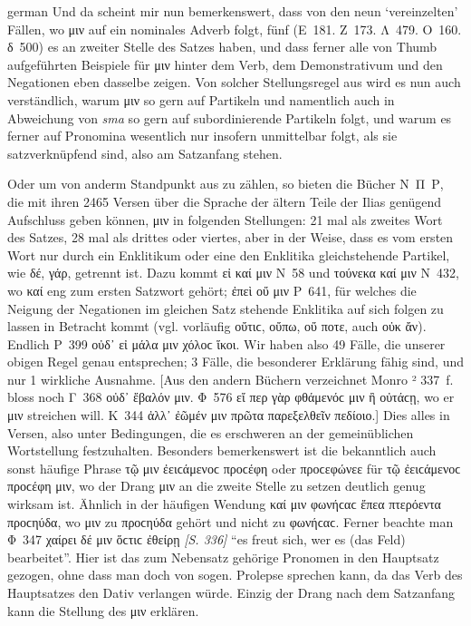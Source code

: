 \begin{otherlanguage*}{german}
Und da scheint mir nun bemerkenswert, dass von den neun ‘vereinzelten’ Fällen, wo μιν auf ein nominales Adverb folgt, fünf (Ε~181. Ζ~173. Λ~479. Ο~160. δ~500) es an zweiter Stelle des Satzes haben, und dass ferner alle von Thumb aufgeführten Beispiele für μιν hinter dem Verb, dem Demonstrativum und den Negationen eben dasselbe zeigen. Von solcher Stellungsregel aus wird es nun auch verständlich, warum μιν so gern auf Partikeln und namentlich auch in Abweichung von \emph{sma} so gern auf subordinierende Partikeln folgt, und warum es ferner auf Pronomina wesentlich nur insofern unmittelbar folgt, als sie satzverknüpfend sind, also am Satzanfang stehen.

Oder um von anderm Standpunkt aus zu zählen, so bieten die Bücher Ν~Π~Ρ, die mit ihren 2465 Versen über die Sprache der ältern Teile der Ilias genügend Aufschluss geben können, μιν in folgenden Stellungen: 21 mal als zweites Wort des Satzes, 28 mal als drittes oder viertes, aber in der Weise, dass es vom ersten Wort nur durch ein Enklitikum oder eine den Enklitika gleichstehende Partikel, wie δέ, γάρ, getrennt ist. Dazu kommt εἰ καί μιν Ν~58 und τούνεκα καί μιν Ν~432, wo καί eng zum ersten Satzwort gehört; ἐπεὶ οὔ μιν Ρ~641, für welches die Neigung der Negationen im gleichen Satz stehende Enklitika auf sich folgen zu lassen in Betracht kommt (vgl. vorläufig οὔτιϲ, οὔπω, οὔ ποτε, auch οὐκ ἄν). Endlich Ρ~399 οὐδ᾽ εἰ μάλα μιν χόλοϲ ἵκοι. Wir haben also 49 Fälle, die unserer obigen Regel genau entsprechen; 3 Fälle, die besonderer Erklärung fähig sind, und nur 1 wirkliche Ausnahme. [Aus den andern Büchern verzeichnet Monro ² 337~f. bloss noch Γ~368 οὐδ᾽ ἔβαλόν μιν. Φ~576 εἴ περ γὰρ φθάμενόϲ μιν ἢ οὐτάϲῃ, wo er μιν streichen will. Κ~344 ἀλλ᾽ ἐῶμέν μιν πρῶτα παρεξελθεῖν πεδίοιο.] Dies alles in Versen, also unter Bedingungen, die es erschweren an der gemeinüblichen Wortstellung festzuhalten. Besonders bemerkenswert ist die bekanntlich auch sonst häufige Phrase τῷ μιν ἐειϲάμενοϲ προϲέφη oder προϲεφώνεε für τῷ ἐειϲάμενοϲ προϲέφη μιν, wo der Drang μιν an die zweite Stelle zu setzen deutlich genug wirksam ist. Ähnlich in der häufigen Wendung καί μιν φωνήϲαϲ ἔπεα πτερόεντα προϲηύδα, wo μιν zu προϲηύδα gehört und nicht zu φωνήϲαϲ. Ferner beachte man Φ~347 χαίρει δέ μιν ὅϲτιϲ ἐθείρῃ \hypertarget{p336}{\emph{[S. 336]}}\label{p336} “es freut sich, wer es (das Feld) bearbeitet”. Hier ist das zum Nebensatz gehörige Pronomen in den Hauptsatz gezogen, ohne dass man doch von sogen. Prolepse sprechen kann, da das Verb des Hauptsatzes den Dativ verlangen würde. Einzig der Drang nach dem Satzanfang kann die Stellung des μιν erklären.


\end{otherlanguage*}
